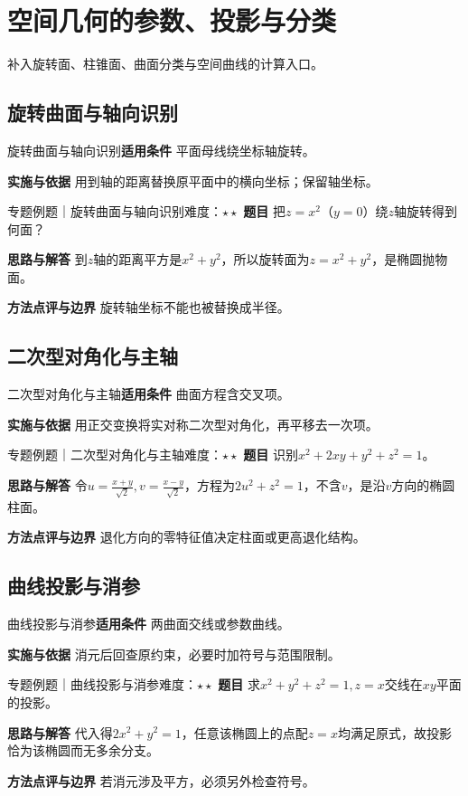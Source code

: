 \section{空间几何的参数、投影与分类}\label{mat:geometry}
\begin{examtip}补入旋转面、柱锥面、曲面分类与空间曲线的计算入口。\end{examtip}
\subsection{旋转曲面与轴向识别}\label{mat:geometry:rotation}
\begin{method}{旋转曲面与轴向识别}\textbf{适用条件} 平面母线绕坐标轴旋转。\par\textbf{实施与依据} 用到轴的距离替换原平面中的横向坐标；保留轴坐标。\end{method}
\begin{example}{专题例题｜旋转曲面与轴向识别}{难度：$\star\star$}
\textbf{题目} 把$z=x^2$（$y=0$）绕$z$轴旋转得到何面？\par\textbf{思路与解答} 到$z$轴的距离平方是$x^2+y^2$，所以旋转面为$z=x^2+y^2$，是椭圆抛物面。\par\textbf{方法点评与边界} 旋转轴坐标不能也被替换成半径。
\end{example}
\subsection{二次型对角化与主轴}\label{mat:geometry:quadratic}
\begin{method}{二次型对角化与主轴}\textbf{适用条件} 曲面方程含交叉项。\par\textbf{实施与依据} 用正交变换将实对称二次型对角化，再平移去一次项。\end{method}
\begin{example}{专题例题｜二次型对角化与主轴}{难度：$\star\star$}
\textbf{题目} 识别$x^2+2xy+y^2+z^2=1$。\par\textbf{思路与解答} 令$u=\frac{x+y}{\sqrt2},v=\frac{x-y}{\sqrt2}$，方程为$2u^2+z^2=1$，不含$v$，是沿$v$方向的椭圆柱面。\par\textbf{方法点评与边界} 退化方向的零特征值决定柱面或更高退化结构。
\end{example}
\subsection{曲线投影与消参}\label{mat:geometry:curve}
\begin{method}{曲线投影与消参}\textbf{适用条件} 两曲面交线或参数曲线。\par\textbf{实施与依据} 消元后回查原约束，必要时加符号与范围限制。\end{method}
\begin{example}{专题例题｜曲线投影与消参}{难度：$\star\star$}
\textbf{题目} 求$x^2+y^2+z^2=1,z=x$交线在$xy$平面的投影。\par\textbf{思路与解答} 代入得$2x^2+y^2=1$，任意该椭圆上的点配$z=x$均满足原式，故投影恰为该椭圆而无多余分支。\par\textbf{方法点评与边界} 若消元涉及平方，必须另外检查符号。
\end{example}

